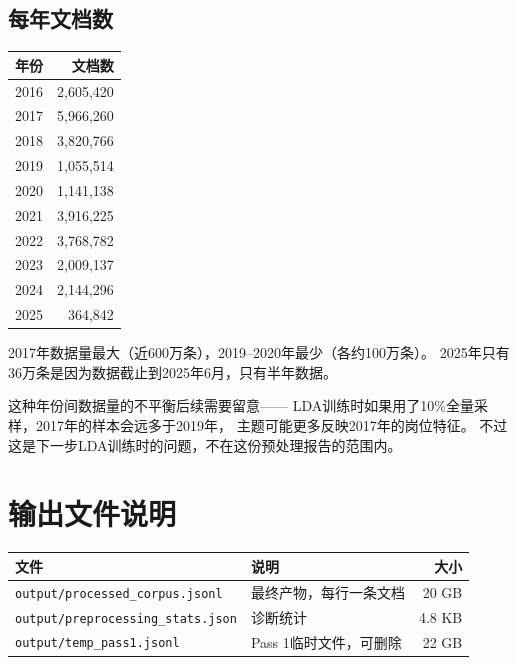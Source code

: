 \documentclass[12pt,a4paper]{ctexart}
\begin{document}
\subsection{每年文档数}

\begin{table}[h]
\centering
\begin{tabular}{rr}
\toprule
\textbf{年份} & \textbf{文档数} \\
\midrule
2016 & 2,605,420 \\
2017 & 5,966,260 \\
2018 & 3,820,766 \\
2019 & 1,055,514 \\
2020 & 1,141,138 \\
2021 & 3,916,225 \\
2022 & 3,768,782 \\
2023 & 2,009,137 \\
2024 & 2,144,296 \\
2025 & 364,842 \\
\bottomrule
\end{tabular}
\end{table}

2017年数据量最大（近600万条），2019--2020年最少（各约100万条）。
2025年只有36万条是因为数据截止到2025年6月，只有半年数据。

这种年份间数据量的不平衡后续需要留意——
LDA训练时如果用了10\%全量采样，2017年的样本会远多于2019年，
主题可能更多反映2017年的岗位特征。
不过这是下一步LDA训练时的问题，不在这份预处理报告的范围内。


\section{输出文件说明}
\label{sec:output}

\begin{table}[h]
\centering
\begin{tabular}{llr}
\toprule
\textbf{文件} & \textbf{说明} & \textbf{大小} \\
\midrule
\texttt{output/processed\_corpus.jsonl} & 最终产物，每行一条文档 & 20 GB \\
\texttt{output/preprocessing\_stats.json} & 诊断统计 & 4.8 KB \\
\texttt{output/temp\_pass1.jsonl} & Pass 1临时文件，可删除 & 22 GB \\
\bottomrule
\end{tabular}
\end{table}
\end{document}
